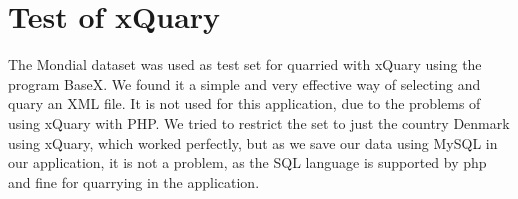 \section{Test of xQuary}
The Mondial dataset was used as test set for quarried with xQuary using the program BaseX. We found it a simple and very effective way of selecting and quary an XML file. It is not used for this application, due to the problems of using xQuary with PHP. We tried to restrict the set to just the country Denmark using xQuary, which worked perfectly, but as we save our data using MySQL in our application, it is not a problem, as the SQL language is supported by php and fine for quarrying in the application.